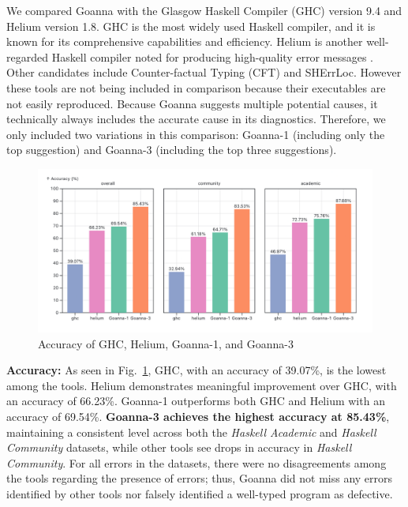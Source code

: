 \documentclass[pdflatex,lineno,sn-nature,Numbered]{sn-jnl}%
\begin{document}
We compared Goanna with the Glasgow Haskell Compiler (GHC) version 9.4 \cite{Gamari_undated-zu} and Helium \cite{Hage2023-kk} version 1.8. GHC is the most widely used Haskell compiler, and it is known for its comprehensive capabilities and efficiency. Helium is another well-regarded Haskell compiler noted for producing high-quality error messages \cite{Heeren2003-kd}. Other candidates include Counter-factual Typing (CFT) \cite{Chen2014-dz,Chen2020-ad,Chen2022-xb} and SHErrLoc. However these tools are not being included in comparison because their executables are not easily reproduced. Because Goanna suggests multiple potential causes, it technically always includes the accurate cause in its diagnostics. Therefore, we only included two variations in this comparison: Goanna-1 (including only the top suggestion) and Goanna-3 (including the top three suggestions).

    \begin{figure}
        \centering
        \includegraphics[width=\linewidth]{images/accuracy.png}
        \caption{Accuracy of GHC, Helium, Goanna-1, and Goanna-3} 
        \label{fig:accuracy}
    \end{figure}


\textbf{Accuracy:} As seen in Fig.~\ref{fig:accuracy}, GHC, with an accuracy of 39.07\%, is the lowest among the tools. Helium demonstrates meaningful improvement over GHC, with an accuracy of 66.23\%. Goanna-1 outperforms both GHC and Helium with an accuracy of 69.54\%. \textbf{Goanna-3 achieves the highest accuracy at 85.43\%}, maintaining a consistent level across both the \textit{Haskell Academic} and \textit{Haskell Community} datasets, while other tools see drops in accuracy in \textit{Haskell Community}. For all errors in the datasets, there were no disagreements among the tools regarding the presence of errors; thus, Goanna did not miss any errors identified by other tools nor falsely identified a well-typed program as defective.
\end{document}

